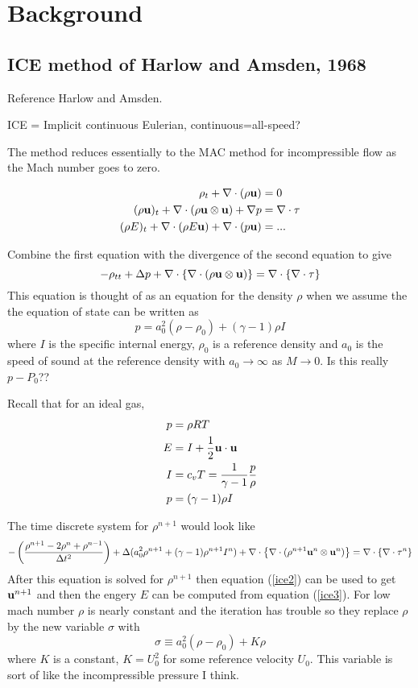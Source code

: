 \documentclass[10pt]{article}
\begin{document}
\section{Background}

\subsection{ICE method of Harlow and Amsden, 1968}

Reference Harlow and Amsden\cite{Harlow68}.

ICE = Implicit continuous Eulerian, continuous=all-speed?

The method reduces essentially to the MAC method for incompressible flow as the Mach number
goes to zero.

\begin{align}
   \rho_t + \nabla\cdot( \rho{\bf u} ) &= 0 \label{ice1} \\
   (\rho{\bf u})_t + \nabla\cdot( \rho {\bf u}\otimes {\bf u} ) + \nabla p & = \nabla\cdot {\bf \tau} \label{ice2} \\
   (\rho E)_t + \nabla\cdot( \rho E {\bf u} ) + \nabla\cdot( p {\bf u} ) & = ... \label{ice2}
\end{align}

Combine the first equation with the divergence of the second equation to give
\[
    -\rho_{tt} + \Delta p + \nabla\cdot\left\{\nabla\cdot( \rho {\bf u}\otimes {\bf u} ) \right\} 
                  = \nabla\cdot\left\{ \nabla\cdot {\bf \tau} \right\} 
\]
This equation is thought of as an equation for the density $\rho$ when we assume the the
equation of state can be written as
\[
    p = a_0^2( \rho-\rho_0) + (\gamma-1) \rho I
\]
where $I$ is the specific internal energy, $\rho_0$ is a reference density and $a_0$ is the speed
of sound at the reference density with $a_0 \rightarrow \infty$ as $M\rightarrow 0$. 
Is this really $p-P_0$??

Recall that for an ideal gas,
\begin{align*}
  p &= \rho R T \\
  E &= I + {1\over 2}{\bf u}\cdot{\bf u} \\
  I &= c_v T = {1\over \gamma-1} {p \over \rho } \\
  p &= (\gamma-1) \rho I
\end{align*}

\newcommand{\rp}{\rho^{n+1}}
The time discrete system for $\rp$ would look like  
\[
   - \left( \rp -2\rho^n + \rho^{n-1} \over \Delta t^2 \right)
    + \Delta( a_0^2\rp + (\gamma-1)\rp I^n )  + \grad\cdot\left\{\grad\cdot( \rp \uv^n\otimes \uv^n ) \right\} 
                  = \grad\cdot\left\{ \grad\cdot \tauv^n \right\} 
\]
After this equation is solved for $\rp$ then equation (\ref{ice2}) can be used to get ${\bf u}^{n+1}$ and
then the engery $E$ can be computed from equation (\ref{ice3}).
For low mach number $\rho$ is nearly constant and the iteration has trouble so they replace $\rho$ by
the new variable $\sigma$ with
\[
     \sigma \equiv a_0^2( \rho-\rho_0) + K \rho
\]
where $K$ is a constant, $K=U_0^2$ for some reference velocity $U_0$. This variable is sort of
like the incompressible pressure I think.
\end{document}
